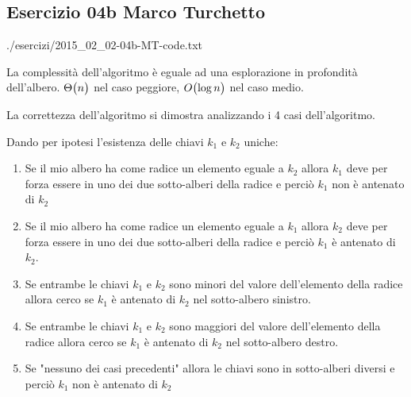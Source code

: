 
\subsection[04b MT]{Esercizio 04b Marco Turchetto}


			{./esercizi/2015_02_02-04b-MT-code.txt}
			
La complessità dell'algoritmo è eguale ad una esplorazione in profondità dell'albero.
$\Theta\bigl(n\bigr)$ nel caso peggiore, $O\bigl(\log n\bigr)$ nel caso medio.

La correttezza dell'algoritmo si dimostra analizzando i 4 casi dell'algoritmo.

Dando per ipotesi l'esistenza delle chiavi $k_1$ e $k_2$ uniche:

\begin{enumerate}
\item Se il mio albero ha come radice un elemento eguale a $k_2$ allora $k_1$ deve per forza essere
	in uno dei due sotto-alberi della radice e perciò $k_1$ non è antenato di $k_2$
	
\item Se il mio albero ha come radice un elemento eguale a $k_1$ allora $k_2$ deve per forza essere
	in uno dei due sotto-alberi della radice e perciò $k_1$ è antenato di $k_2$.
	 
\item Se entrambe le chiavi $k_1$ e $k_2$ sono minori del valore dell'elemento della radice allora
	cerco se $k_1$ è antenato di $k_2$ nel sotto-albero sinistro.
	
\item Se entrambe le chiavi $k_1$ e $k_2$ sono maggiori del valore dell'elemento della radice allora
	cerco se $k_1$ è antenato di $k_2$ nel sotto-albero destro.
	
\item Se "nessuno dei casi precedenti" allora le chiavi sono in sotto-alberi diversi e perciò $k_1$
	 non è antenato di $k_2$
\end{enumerate}
